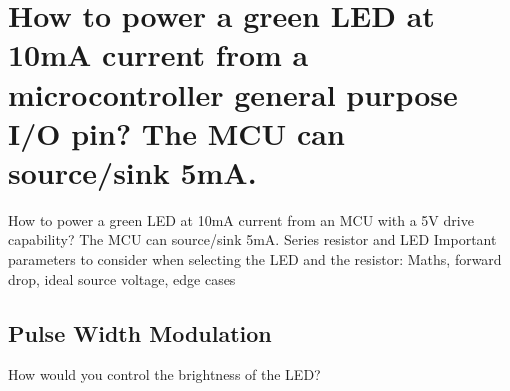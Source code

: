 \documentclass[main.tex]{subfiles}
\begin{document}
\section{How to power a green LED at 10mA current from a microcontroller general purpose I/O pin? The MCU can source/sink 5mA.}

How to power a green LED at 10mA current from an MCU with a 5V drive capability? The MCU can source/sink 5mA. 
Series resistor and LED
Important parameters to consider when selecting the LED and the resistor: Maths, forward drop, ideal source voltage, edge cases

\subsection{Pulse Width Modulation}
How would you control the brightness of the LED?
\end{document}
